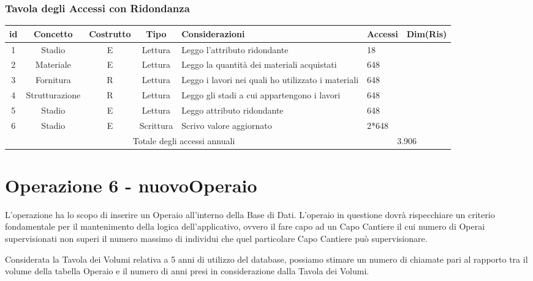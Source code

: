 \documentclass[12pt,a4paper]{report}
\begin{document}
            \subsubsection{Tavola degli Accessi con Ridondanza}
            \begin{tabular}{|c|c|c|c|p{4cm}|p{3cm}|c|}
                \hline
                \textbf{id} & \textbf{Concetto} & \textbf{Costrutto} & \textbf{Tipo} & \textbf{Considerazioni} & \textbf{Accessi} & \textbf{Dim(Ris)} \\ \hline
                1 & Stadio & E & Lettura & Leggo l'attributo ridondante & 18 & ~ \\ \hline
                2 & Materiale & E & Lettura & Leggo la quantità dei materiali acquistati & 648 & ~ \\ \hline
                3 & Fornitura & R & Lettura & Leggo i lavori nei quali ho utilizzato i materiali &  648 & ~ \\ \hline
                4 & Strutturazione & R & Lettura & Leggo gli stadi a cui appartengono i lavori & 648 & ~ \\ \hline
                5 & Stadio & E & Lettura & Leggo attributo ridondante & 648 & ~ \\ \hline
                6 & Stadio & E & Scrittura & Scrivo valore aggiornato & 2*648 & ~ \\ \hline
                \multicolumn{5}{|c|}{Totale degli accessi annuali} & \multicolumn{2}{|c|}{3.906} \\ \hline
            \end{tabular}

        \newpage

        \section{Operazione 6 - nuovoOperaio}
            L'operazione ha lo scopo di inserire un Operaio all'interno della Base di Dati. L'operaio in questione dovrà rispecchiare un criterio fondamentale per il mantenimento della logica dell'applicativo, ovvero il fare capo ad un Capo Cantiere il cui numero di Operai supervisionati non superi il numero massimo di individui che quel particolare Capo Cantiere può supervisionare.

            Considerata la Tavola dei Volumi relativa a 5 anni di utilizzo del database, possiamo stimare un numero di chiamate pari al rapporto tra il volume della tabella Operaio e il numero di anni presi in considerazione dalla Tavola dei Volumi.
        
\end{document}
